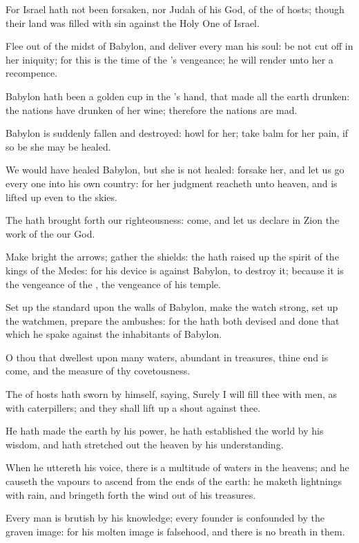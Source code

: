 \Verse For Israel hath not been forsaken, nor Judah of his God, of the \LORD of hosts; though their land was filled with sin against the Holy One of Israel.

\Verse Flee out of the midst of Babylon, and deliver every man his soul: be not cut off in her iniquity; for this is the time of the \LORD's vengeance; he will render unto her a recompence.

\Verse Babylon hath been a golden cup in the \LORD's hand, that made all the earth drunken: the nations have drunken of her wine; therefore the nations are mad.

\Verse Babylon is suddenly fallen and destroyed: howl for her; take balm for her pain, if so be she may be healed.

\Verse We would have healed Babylon, but she is not healed: forsake her, and let us go every one into his own country: for her judgment reacheth unto heaven, and is lifted up even to the skies.

\Verse The \LORD hath brought forth our righteousness: come, and let us declare in Zion the work of the \LORD our God.

\Verse Make bright the arrows; gather the shields: the \LORD hath raised up the spirit of the kings of the Medes: for his device is against Babylon, to destroy it; because it is the vengeance of the \LORD, the vengeance of his temple.

\Verse Set up the standard upon the walls of Babylon, make the watch strong, set up the watchmen, prepare the ambushes: for the \LORD hath both devised and done that which he spake against the inhabitants of Babylon.

\Verse O thou that dwellest upon many waters, abundant in treasures, thine end is come, and the measure of thy covetousness.

\Verse The \LORD of hosts hath sworn by himself, saying, Surely I will fill thee with men, as with caterpillers; and they shall lift up a shout against thee.

\Verse He hath made the earth by his power, he hath established the world by his wisdom, and hath stretched out the heaven by his understanding.

\Verse When he uttereth his voice, there is a multitude of waters in the heavens; and he causeth the vapours to ascend from the ends of the earth: he maketh lightnings with rain, and bringeth forth the wind out of his treasures.

\Verse Every man is brutish by his knowledge; every founder is confounded by the graven image: for his molten image is falsehood, and there is no breath in them.

